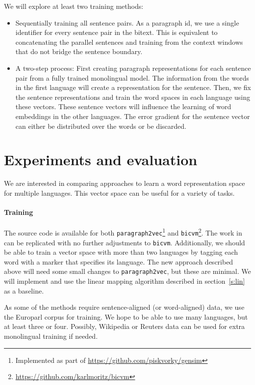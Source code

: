 \documentclass[twocolumn]{article}
\begin{document}
We will explore at least two training methods:
\begin{itemize}
\item 
	Sequentially training all sentence pairs. As a paragraph id, we use a single identifier for every sentence pair in the bitext.
	This is equivalent to concatenating the parallel sentences and training from the context windows that do not bridge the sentence boundary.
\item 
	A two-step process:
	First creating paragraph representations for each sentence pair from a fully trained monolingual model. The information from the words in the first language will create a representation for the sentence.
	Then, we fix the sentence representations and train the word spaces in each language using these vectors.
	These sentence vectors will influence the learning of word embeddings in the other languages.
	The error gradient for the sentence vector can either be distributed over the words or be discarded.
\end{itemize}


\section{Experiments and evaluation}\label{s:experiments}

We are interested in comparing approaches to learn a word representation space for multiple languages. This vector space can be useful for a variety of tasks.


\paragraph{Training}

The source code is available for both \texttt{paragraph2vec}\footnote{Implemented as part of \url{https://github.com/piskvorky/gensim}} and \texttt{bicvm}\footnote{\url{https://github.com/karlmoritz/bicvm}}. The work in \cite{hermann2013multilingual} can be replicated with no further adjustments to \texttt{bicvm}.
Additionally, we should be able to train a vector space with more than two languages by tagging each word with a marker that specifies its language.
The new approach described above will need some small changes to \texttt{paragraph2vec}, but these are minimal.
We will implement and use the linear mapping algorithm described in section~\ref{s:lin} as a baseline.

As some of the methods require sentence-aligned (or word-aligned) data, we use the Europarl corpus for training. We hope to be able to use many languages, but at least three or four.
Possibly, Wikipedia or Reuters data can be used for extra monolingual training if needed.
\end{document}
